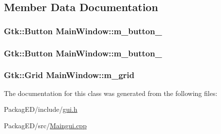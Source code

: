 \subsection{Member Data Documentation}
\subsubsection[{\texorpdfstring{m\+\_\+button\+\_\+1}{m_button_1}}]{\setlength{\rightskip}{0pt plus 5cm}Gtk\+::\+Button Main\+Window\+::m\+\_\+button\+\_\hspace{0.3cm}{\ttfamily [private]}}\hypertarget{class_main_window_a3fb958b7cfc0c5c8570cd0549540959b}{}\label{class_main_window_a3fb958b7cfc0c5c8570cd0549540959b}
\subsubsection[{\texorpdfstring{m\+\_\+button\+\_\+2}{m_button_2}}]{\setlength{\rightskip}{0pt plus 5cm}Gtk\+::\+Button Main\+Window\+::m\+\_\+button\+\_\hspace{0.3cm}{\ttfamily [private]}}\hypertarget{class_main_window_a903e80cb1e32d50fb1c99ee713a79c41}{}\label{class_main_window_a903e80cb1e32d50fb1c99ee713a79c41}
\subsubsection[{\texorpdfstring{m\+\_\+grid}{m_grid}}]{\setlength{\rightskip}{0pt plus 5cm}Gtk\+::\+Grid Main\+Window\+::m\+\_\+grid\hspace{0.3cm}{\ttfamily [private]}}\hypertarget{class_main_window_a376f22a8ee7464a0b7c19fcf2cf7e41e}{}\label{class_main_window_a376f22a8ee7464a0b7c19fcf2cf7e41e}


The documentation for this class was generated from the following files\+:\begin{DoxyCompactItemize}
\item 
Packag\+E\+D/include/\hyperlink{gui_8h}{gui.\+h}\item 
Packag\+E\+D/src/\hyperlink{_maingui_8cpp}{Maingui.\+cpp}\end{DoxyCompactItemize}
